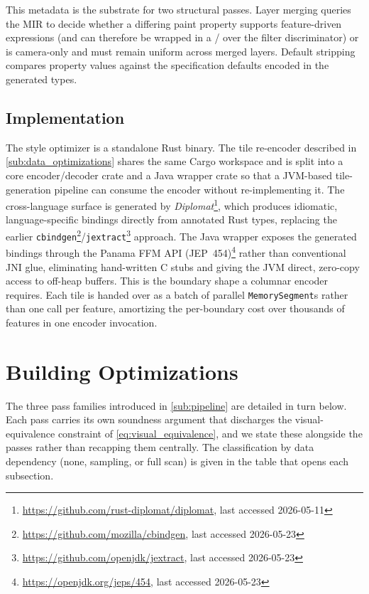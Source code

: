 This metadata is the substrate for two structural passes.
Layer merging queries the MIR to decide whether a differing paint property supports feature-driven expressions (and can therefore be wrapped in a /  over the filter discriminator) or is camera-only and must remain uniform across merged layers.
Default stripping compares property values against the specification defaults encoded in the generated types.

\subsection{Implementation}\label{sub:implementation}

The style optimizer is a standalone Rust binary.
The tile re-encoder described in \cref{sub:data_optimizations} shares the same Cargo workspace and is split into a core encoder/decoder crate and a Java wrapper crate so that a \ac{JVM}-based tile-generation pipeline can consume the encoder without re-implementing it.
The cross-language surface is generated by \emph{Diplomat}\footnote{\url{https://github.com/rust-diplomat/diplomat}, last accessed 2026-05-11}, which produces idiomatic, language-specific bindings directly from annotated Rust types, replacing the earlier \texttt{cbindgen}\footnote{\url{https://github.com/mozilla/cbindgen}, last accessed 2026-05-23}/\texttt{jextract}\footnote{\url{https://github.com/openjdk/jextract}, last accessed 2026-05-23} approach.
The Java wrapper exposes the generated bindings through the Panama \ac{FFM} \ac{API} (JEP~454)\footnote{\url{https://openjdk.org/jeps/454}, last accessed 2026-05-23} rather than conventional \ac{JNI} glue, eliminating hand-written C stubs and giving the \ac{JVM} direct, zero-copy access to off-heap buffers.
This is the boundary shape a columnar encoder requires.
Each tile is handed over as a batch of parallel \texttt{MemorySegment}s rather than one call per feature, amortizing the per-boundary cost over thousands of features in one encoder invocation.

\section{Building Optimizations}\label{sec:building_optimizations}

The three pass families introduced in \cref{sub:pipeline} are detailed in turn below.
Each pass carries its own soundness argument that discharges the visual-equivalence constraint of \cref{eq:visual_equivalence}, and we state these alongside the passes rather than recapping them centrally.
The classification by data dependency (none, sampling, or full scan) is given in the table that opens each subsection.

